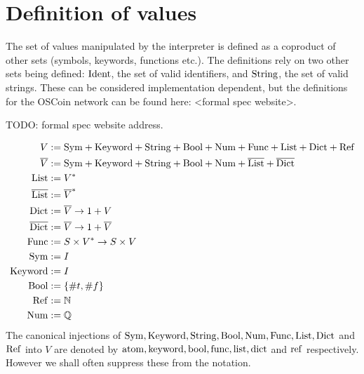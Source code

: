 \section{Definition of \rad{} values}
\label{value-definition}

The set of values manipulated by the \rad interpreter is defined as a coproduct
of other sets (symbols, keywords, functions etc.). The definitions rely on two
other sets being defined: $\mathrm{Ident}$, the set of valid identifiers, and $\mathrm{String}$,
the set of valid strings. These can be considered implementation dependent, but
the definitions for the OSCoin network can be found here: <formal spec website>.

TODO: formal spec website address.

\begin{align*}
  V &:= \mathrm{Sym} + \mathrm{Keyword} + \mathrm{String} + \mathrm{Bool} + \mathrm{Num} + \mathrm{Func} + \mathrm{List} + \mathrm{Dict} + \mathrm{Ref}\\
  \overline{V} &:= \mathrm{Sym} + \mathrm{Keyword} + \mathrm{String} + \mathrm{Bool} + \mathrm{Num} + \overline{\mathrm{List}} + \overline{\mathrm{Dict}}\\
  \mathrm{List} &:= V^*\\
  \overline{\mathrm{List}} &:= \overline{V}^*\\
  \mathrm{Dict} &:= \overline{V} \to 1 + V\\
  \overline{\mathrm{Dict}} &:= \overline{V} \to 1 + \overline{V}\\
  \mathrm{Func} &:= S \times V^* \to S \times V\\
  \mathrm{Sym} &:= I\\
  \mathrm{Keyword} &:= I\\
  \mathrm{Bool} &:= \{\#t, \#f\}\\
  \mathrm{Ref} &:= \mathbb{N}\\
  \mathrm{Num} &:= \mathbb{Q}
\end{align*}
The canonical injections of $\mathrm{Sym}, \mathrm{Keyword}, \mathrm{String}, \mathrm{Bool}, \mathrm{Num}, \mathrm{Func}, \mathrm{List},
\mathrm{Dict}$ and $\mathrm{Ref}$ into $V$ are denoted by $\mathrm{atom}, \mathrm{keyword}, \mathrm{bool}, \mathrm{func},
\mathrm{list}, \mathrm{dict}$ and $\mathrm{ref}$ respectively. However we shall often suppress these
from the notation.
